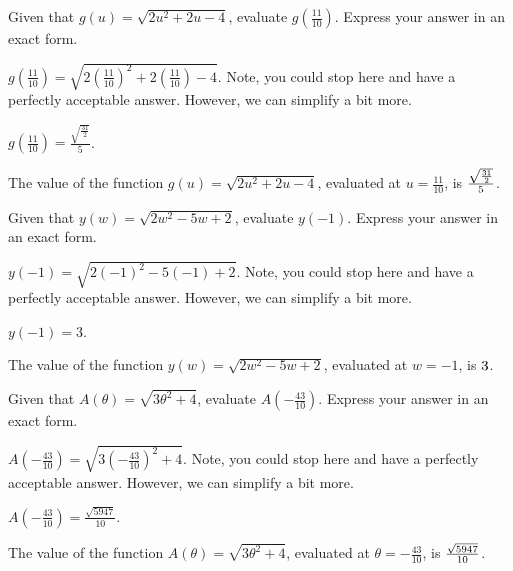 \begin{shuffle}
\begin{exercise}
Given that $g(u)=\sqrt{2 u^2+2 u-4}$, evaluate $g\left(\frac{11}{10}\right)$. Express your answer in an exact form.
\begin{solution}
\begin{hint}
$g\left(\frac{11}{10}\right)=\sqrt{2 (\frac{11}{10})^2+2 (\frac{11}{10})-4}$. Note, you could stop here and have a perfectly acceptable answer. However, we can simplify a bit more. 
\end{hint}
\begin{hint}
$g\left(\frac{11}{10}\right)=\frac{\sqrt{\frac{31}{2}}}{5}$.
\end{hint}
The value of the function $g(u)=\sqrt{2 u^2+2 u-4}$, evaluated at $u=\frac{11}{10}$, is ${\frac{\sqrt{\frac{31}{2}}}{5}}$.
\end{solution}
\end{exercise}

\begin{exercise}
Given that $y(w)=\sqrt{2 w^2-5 w+2}$, evaluate $y\left(-1\right)$. Express your answer in an exact form.
\begin{solution}
\begin{hint}
$y\left(-1\right)=\sqrt{2 (-1)^2-5 (-1)+2}$. Note, you could stop here and have a perfectly acceptable answer. However, we can simplify a bit more. 
\end{hint}
\begin{hint}
$y\left(-1\right)=3$.
\end{hint}
The value of the function $y(w)=\sqrt{2 w^2-5 w+2}$, evaluated at $w=-1$, is ${3}$.
\end{solution}
\end{exercise}

\begin{exercise}
Given that $A(\theta)=\sqrt{3 \theta ^2+4}$, evaluate $A\left(-\frac{43}{10}\right)$. Express your answer in an exact form.
\begin{solution}
\begin{hint}
$A\left(-\frac{43}{10}\right)=\sqrt{3 (-\frac{43}{10})^2+4}$. Note, you could stop here and have a perfectly acceptable answer. However, we can simplify a bit more. 
\end{hint}
\begin{hint}
$A\left(-\frac{43}{10}\right)=\frac{\sqrt{5947}}{10}$.
\end{hint}
The value of the function $A(\theta)=\sqrt{3 \theta ^2+4}$, evaluated at $\theta=-\frac{43}{10}$, is ${\frac{\sqrt{5947}}{10}}$.
\end{solution}
\end{exercise}


\end{shuffle}
